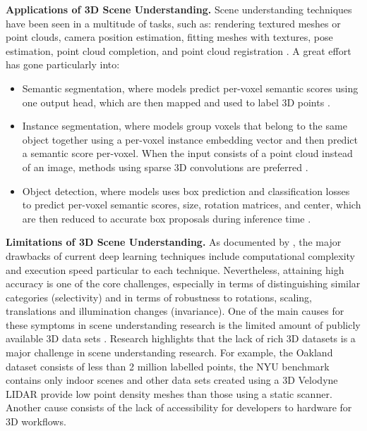 

\textbf{Applications of 3D Scene Understanding.}
Scene understanding techniques have been seen in a multitude of tasks, such as: rendering textured meshes or point clouds, camera position estimation, fitting meshes with textures, pose estimation, point cloud completion, and point cloud registration \cite{najibi2020dops, ravi2020pytorch3d}. A great effort has gone particularly into:
\begin{itemize}
    \item Semantic segmentation, where models predict per-voxel semantic scores using one output head, which are then mapped and used to label 3D points \cite{najibi2020dops, hackel2017semantic3d, qi2017pointnet, qi2017pointnet++}.
    \item Instance segmentation, where models group voxels that belong to the same object together using a per-voxel instance embedding vector and then predict a semantic score per-voxel. When the input consists of a point cloud instead of an image, methods using sparse 3D convolutions are preferred \cite{najibi2020dops, jiang2020pointgroup}.
    \item Object detection, where models uses box prediction and classification losses to predict per-voxel semantic scores, size, rotation matrices, and center, which are then reduced to accurate box proposals during inference time \cite{najibi2020dops, qi2019deep}. 
\end{itemize}

\textbf{Limitations of 3D Scene Understanding.}
As documented by \textcite{surendran2020scene}, the major drawbacks of current deep learning techniques include computational complexity and execution speed particular to each technique. Nevertheless, attaining high accuracy is one of the core challenges, especially in terms of distinguishing similar categories (selectivity) and in terms of robustness to rotations, scaling, translations and illumination changes (invariance).
One of the main causes for these symptoms in scene understanding research is the limited amount of publicly available 3D data sets \cite{han2019image}.
Research \cite{hackel2017semantic3d} highlights that the lack of rich 3D datasets is a major challenge in scene understanding research. For example, the Oakland dataset consists of less than 2 million labelled points, the NYU benchmark contains only indoor scenes and other data sets created using a 3D Velodyne LIDAR provide low point density meshes than those using a static scanner.
Another cause consists of the lack of accessibility for developers to hardware \cite{singh2018fotonnet} for 3D workflows. 

